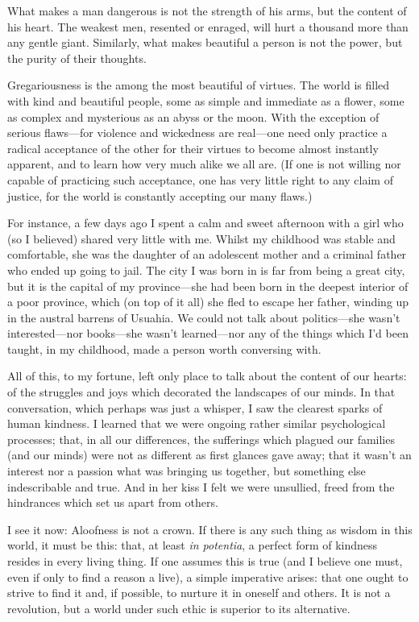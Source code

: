 \documentclass[a4paper, 12pt]{article}
\begin{document}
What makes a man dangerous is not the strength of his arms, but the
content of his heart. The weakest men, resented or enraged, will hurt
a thousand more than any gentle giant. Similarly, what makes beautiful
a person is not the power, but the purity of their thoughts. 

Gregariousness is the among the most beautiful of virtues. The world is filled
with kind and beautiful people, some as simple and immediate as a flower, some
as complex and mysterious as an abyss or the moon. With the exception of
serious flaws---for violence and wickedness are real---one need only practice a
radical acceptance of the other for their virtues to become almost instantly
apparent, and to learn how very much alike we all are. (If one is not willing
nor capable of practicing such acceptance, one has very little right to any
claim of justice, for the world is constantly accepting our many flaws.)

For instance, a few days ago I spent a calm and sweet afternoon with a girl who
(so I believed) shared very little with me. Whilst my childhood was stable and
comfortable, she was the daughter of an adolescent mother and a criminal father
who ended up going to jail. The city I was born in is far from being a great
city, but it is the capital of my province---she had been born in the deepest
interior of a poor province, which (on top of it all) she fled to escape her
father, winding up in the austral barrens of Usuahia. We could not talk about
politics---she wasn't interested---nor books---she wasn't learned---nor any of
the things which I'd been taught, in my childhood, made a person worth
conversing with. 

All of this, to my fortune, left only place to talk about the content of
our hearts: of the struggles and joys which decorated the landscapes of
our minds. In that conversation, which perhaps was just a whisper, I saw
the clearest sparks of human kindness. I learned that we were ongoing
rather similar psychological processes; that, in all our differences, the
sufferings which plagued our families (and our minds) were not as
different as first glances gave away; that it wasn't an interest nor
a passion what was bringing us together, but something else indescribable and
true. And in her kiss I felt we were unsullied, freed from the hindrances which
set us apart from others.


I see it now: Aloofness is not a crown. If there is any such thing as wisdom in
this world, it must be this: that, at least \textit{in potentia}, a perfect
form of kindness resides in every living thing. If one assumes this is true
(and I believe one must, even if only to find a reason a live), a simple
imperative arises: that one ought to strive to find it and, if possible, to
nurture it in oneself and others. It is not a revolution, but a world under
such ethic is superior to its alternative.
\end{document}
